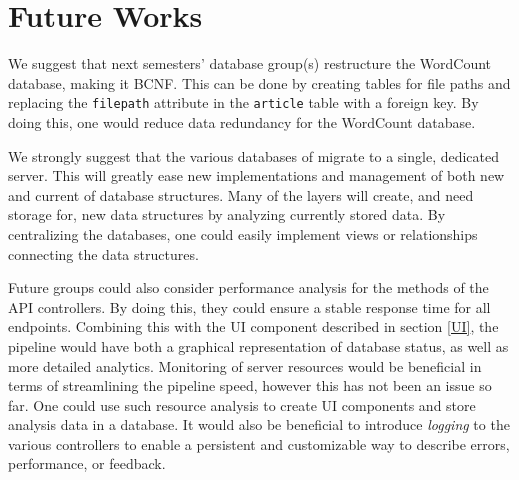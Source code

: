 \section{Future Works}
We suggest that next semesters' database group(s) restructure the WordCount database, making it BCNF. 
This can be done by creating tables for file paths and replacing the \texttt{filepath} attribute in the \texttt{article} table with a foreign key.
By doing this, one would reduce data redundancy for the WordCount database. 

We strongly suggest that the various databases of \knox{} migrate to a single, dedicated server.
This will greatly ease new implementations and management of both new and current of database structures.
Many of the layers will create, and need storage for, new data structures by analyzing currently stored data.
By centralizing the \knox{} databases, one could easily implement views or relationships connecting the data structures.

Future groups could also consider performance analysis for the methods of the API controllers. 
By doing this, they could ensure a stable response time for all endpoints.
Combining this with the UI component described in section \ref{UI}, the pipeline would have both a graphical representation of database status, as well as more detailed analytics.
Monitoring of server resources would be beneficial in terms of streamlining the pipeline speed, however this has not been an issue so far.
One could use such resource analysis to create UI components and store analysis data in a database. 
It would also be beneficial to introduce \textit{logging}\cite{ASPLogging} to the various controllers to enable a persistent and customizable way to describe errors, performance, or feedback.
